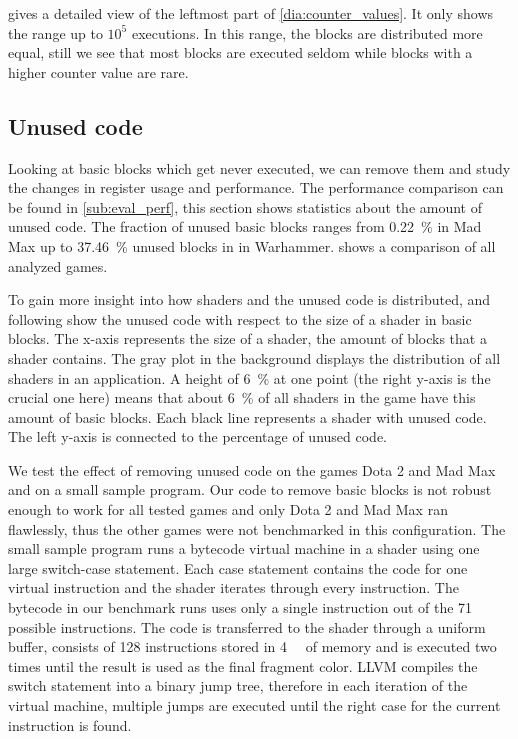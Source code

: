  gives a detailed view of the leftmost part of \cref{dia:counter_values}.
It only shows the range up to $10^5$ executions.
In this range, the blocks are distributed more equal, still we see that most blocks are executed seldom while blocks with a higher counter value are rare.


\subsection{Unused code}
\label{sub:eval_unused}
Looking at basic blocks which get never executed, we can remove them and study the changes in register usage and performance.
The performance comparison can be found in \cref{sub:eval_perf}, this section shows statistics about the amount of unused code.
The fraction of unused basic blocks ranges from \SI{0.22}{\percent} in Mad Max up to \SI{37.46}{\percent} unused blocks in in Warhammer.
 shows a comparison of all analyzed games.


To gain more insight into how shaders and the unused code is distributed,  and following show the unused code with respect to the size of a shader in basic blocks.
The x-axis represents the size of a shader, the amount of blocks that a shader contains.
The gray plot in the background displays the distribution of all shaders in an application.
A height of \SI{6}{\percent} at one point (the right y-axis is the crucial one here) means that about \SI{6}{\percent} of all shaders in the game have this amount of basic blocks.
Each black line represents a shader with unused code. The left y-axis is connected to the percentage of unused code.


We test the effect of removing unused code on the games Dota 2 and Mad Max and on a small sample program.
Our code to remove basic blocks is not robust enough to work for all tested games and only Dota 2 and Mad Max ran flawlessly, thus the other games were not benchmarked in this configuration.
The small sample program runs a bytecode virtual machine in a shader using one large switch-case statement.
Each case statement contains the code for one virtual instruction and the shader iterates through every instruction.
The bytecode in our benchmark runs uses only a single instruction out of the 71 possible instructions.
The code is transferred to the shader through a uniform buffer, consists of 128 instructions stored in \SI{4}{\kibi\byte} of memory and is executed two times until the result is used as the final fragment color.
LLVM compiles the switch statement into a binary jump tree, therefore in each iteration of the virtual machine, multiple jumps are executed until the right case for the current instruction is found.

